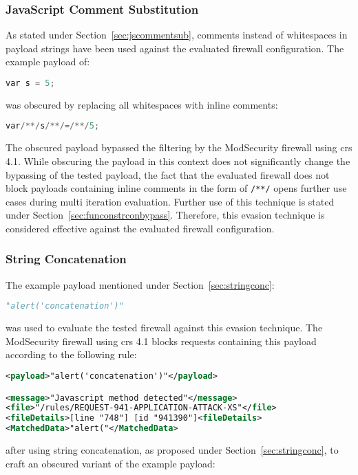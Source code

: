 \subsubsection{JavaScript Comment Substitution}
\label{sec:jscommentsubsingleiter}
As stated under Section~\ref{sec:jscommentsub}, comments instead of whitespaces in payload strings have been used against the evaluated firewall configuration. The example payload of:

\begin{lstlisting}[style=basicStyle,language=Python]
var s = 5;
\end{lstlisting}
was obscured by replacing all whitespaces with inline comments:

\begin{lstlisting}[style=basicStyle,language=Python]
var/**/s/**/=/**/5;
\end{lstlisting}
The obscured payload bypassed the filtering by the ModSecurity firewall using \acrshort{crs} 4.1. While obscuring the payload in this context does not significantly change the bypassing of the tested payload, the fact that the evaluated firewall does not block payloads containing inline comments in the form of \verb|/**/| opens further use cases during multi iteration evaluation. Further use of this technique is stated under Section~\ref{sec:funconstrconbypass}. Therefore, this evasion technique is considered effective against the evaluated firewall configuration.

\subsubsection{String Concatenation}
\label{sec:stringconcsingleiter}
The example payload mentioned under Section~\ref{sec:stringconc}:

\begin{lstlisting}[style=basicStyle, language=Python]
"alert('concatenation')"
\end{lstlisting}
was used to evaluate the tested firewall against this evasion technique. The ModSecurity firewall using \acrshort{crs} 4.1 blocks requests containing this payload according to the following rule:

\begin{lstlisting}[style=ruleStyle, language=XML, caption="alert('concatenation')" blocked, label={lst:alertconcblocked}]
<payload>"alert('concatenation')"</payload>

<message>"Javascript method detected"</message>
<file>"/rules/REQUEST-941-APPLICATION-ATTACK-XS"</file>
<fileDetails>[line "748"] [id "941390"]<fileDetails>
<MatchedData>"alert("</MatchedData>
\end{lstlisting}
after using string concatenation, as proposed under Section~\ref{sec:stringconc}, to craft an obscured variant of the example payload:

